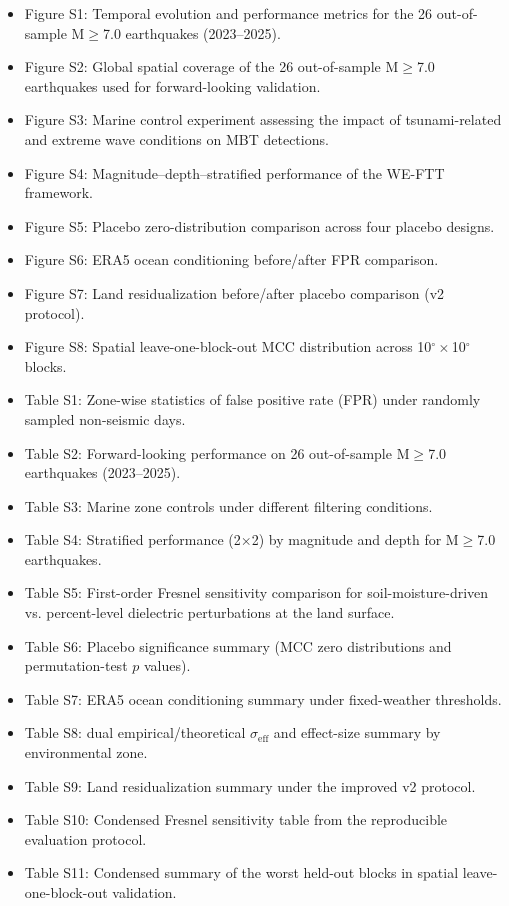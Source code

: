 \documentclass[preprint,review,12pt,authoryear]{elsarticle}
\begin{document}
{\small
\begin{itemize}
    \setlength\itemsep{0.15em}
    \item Figure S1: Temporal evolution and performance metrics for the 26 out-of-sample M$\ge$7.0 earthquakes (2023--2025).
    \item Figure S2: Global spatial coverage of the 26 out-of-sample M$\ge$7.0 earthquakes used for forward-looking validation.
    \item Figure S3: Marine control experiment assessing the impact of tsunami-related and extreme wave conditions on MBT detections.
    \item Figure S4: Magnitude--depth--stratified performance of the WE-FTT framework.
    \item Figure S5: Placebo zero-distribution comparison across four placebo designs.
    \item Figure S6: ERA5 ocean conditioning before/after FPR comparison.
    \item Figure S7: Land residualization before/after placebo comparison (v2 protocol).
    \item Figure S8: Spatial leave-one-block-out MCC distribution across 10$^{\circ}\times$10$^{\circ}$ blocks.
    \item Table S1: Zone-wise statistics of false positive rate (FPR) under randomly sampled non-seismic days.
    \item Table S2: Forward-looking performance on 26 out-of-sample M$\ge$7.0 earthquakes (2023--2025).
    \item Table S3: Marine zone controls under different filtering conditions.
    \item Table S4: Stratified performance (2$\times$2) by magnitude and depth for M$\ge$7.0 earthquakes.
    \item Table S5: First-order Fresnel sensitivity comparison for soil-moisture-driven vs. percent-level dielectric perturbations at the land surface.
    \item Table S6: Placebo significance summary (MCC zero distributions and permutation-test $p$ values).
    \item Table S7: ERA5 ocean conditioning summary under fixed-weather thresholds.
    \item Table S8: dual empirical/theoretical $\sigma_{\mathrm{eff}}$ and effect-size summary by environmental zone.
    \item Table S9: Land residualization summary under the improved v2 protocol.
    \item Table S10: Condensed Fresnel sensitivity table from the reproducible evaluation protocol.
    \item Table S11: Condensed summary of the worst held-out blocks in spatial leave-one-block-out validation.
\end{itemize}
}
\end{document}
